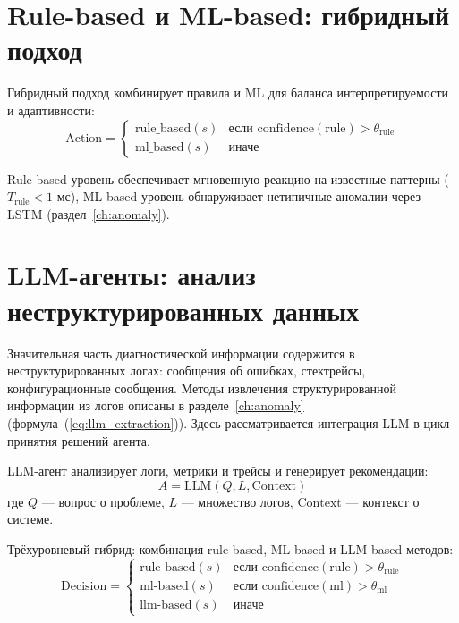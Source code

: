 \section{Rule-based и ML-based: гибридный подход}

Гибридный подход комбинирует правила и ML для баланса интерпретируемости и адаптивности:
\begin{equation}
\text{Action} = \begin{cases}
\text{rule\_based}(s) & \text{если } \text{confidence}(\text{rule}) > \theta_{\text{rule}} \\
\text{ml\_based}(s) & \text{иначе}
\end{cases}
\label{eq:hybrid_approach}
\end{equation}

Rule-based уровень обеспечивает мгновенную реакцию на известные паттерны ($T_{\text{rule}} < 1$ мс), ML-based уровень обнаруживает нетипичные аномалии через LSTM (раздел~\ref{ch:anomaly}).

\section{LLM-агенты: анализ неструктурированных данных}

Значительная часть диагностической информации содержится в неструктурированных логах: сообщения об ошибках, стектрейсы, конфигурационные сообщения. Методы извлечения структурированной информации из логов описаны в разделе~\ref{ch:anomaly} (формула~(\ref{eq:llm_extraction})). Здесь рассматривается интеграция LLM в цикл принятия решений агента.

LLM-агент анализирует логи, метрики и трейсы и генерирует рекомендации:
\begin{equation}
A = \text{LLM}(Q, L, \text{Context})
\label{eq:llm_qa}
\end{equation}
где $Q$ --- вопрос о проблеме, $L$ --- множество логов, $\text{Context}$ --- контекст о системе.

Трёхуровневый гибрид: комбинация rule-based, ML-based и LLM-based методов:
\begin{equation}
\text{Decision} = \begin{cases}
\text{rule-based}(s) & \text{если } \text{confidence}(\text{rule}) > \theta_{\text{rule}} \\
\text{ml-based}(s) & \text{если } \text{confidence}(\text{ml}) > \theta_{\text{ml}} \\
\text{llm-based}(s) & \text{иначе}
\end{cases}
\label{eq:hybrid_decision}
\end{equation}

